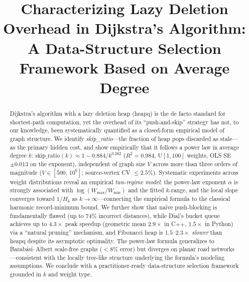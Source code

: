 \documentclass[conference]{IEEEtran}
\begin{document}
\title{Characterizing Lazy Deletion Overhead in Dijkstra's Algorithm:\\
A Data-Structure Selection Framework Based on Average Degree}

\author{
}

\maketitle

\begin{abstract}
Dijkstra's algorithm with a lazy deletion heap (heapq) is the de facto
standard for shortest-path computation, yet the overhead of its
``push-and-skip'' strategy has not, to our knowledge, been
systematically quantified as a closed-form empirical model of graph structure.
We identify \emph{skip\_ratio}---the fraction of heap pops discarded as
stale---as the primary hidden cost, and show empirically that it follows
a power law in average degree $k$:
$\text{skip\_ratio}(k)\approx 1 - 0.884/k^{0.262}$
($R^2{=}0.984$, $\mathrm{U}[1,100]$ weights, OLS SE $\pm0.013$ on the
exponent), independent of graph size $V$ across more than three orders
of magnitude ($V\in[500,\,10^6]$; source-vertex CV $\leq 2.5\%$).
Systematic experiments across weight distributions reveal an
empirical \emph{two-regime model}: the power-law exponent $\alpha$ is
strongly associated with $\log(W_{\max}/W_{\min})$ and the fitted
$k$-range, and the local slope converges toward $1/H_k$ as
$k\to\infty$---connecting the empirical formula to the classical
harmonic record-minimum bound.
We further show that na\"ive push-blocking is fundamentally flawed
(up to 74\% incorrect distances), while Dial's bucket queue achieves up
to $4.3\times$ peak speedup (geometric mean $2.9\times$ in C++,
$1.5\times$ in Python) via a ``natural pruning'' mechanism, and
Fibonacci heap is $1.5$--$2.3\times$ \emph{slower} than heapq despite
its asymptotic optimality.
The power-law formula generalizes to Barab\'{a}si--Albert scale-free
graphs ($<8\%$ error) but diverges on planar road networks---consistent
with the locally tree-like structure underlying the formula's modeling assumptions.
We conclude with a practitioner-ready data-structure selection framework
grounded in $k$ and weight type.
\end{abstract}
\end{document}
